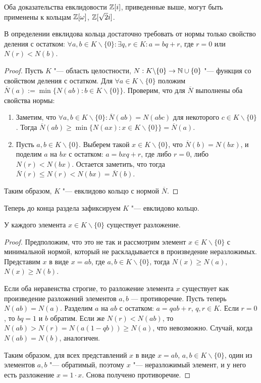\begin{note}
	Оба доказательства евклидовости $\mathbb{Z}[i]$, приведенные выше, могут быть применены к кольцам $\mathbb{Z}[\omega]$, $\mathbb{Z}[\sqrt{2}i]$.
\end{note}

\begin{proposition}
	В определении евклидова кольца достаточно требовать от нормы только свойство деления с остатком: $\forall a, b \in K\backslash\{0\}: \exists q, r \in K: a = bq + r$, где $r = 0$ или $N(r) < N(b)$.
\end{proposition}

\begin{proof}
	Пусть $K$ "--- область целостности, $N: K \backslash \{0\} \to \mathbb{N} \cup \{0\}$ "--- функция со свойством деления с остатком. Для $\forall a \in K \backslash \{0\}$ положим $\overline{N}(a) := \min\{N(ab) : b \in K \backslash \{0\}\}$. Проверим, что для $\overline{N}$ выполнены оба свойства нормы:
	\begin{enumerate}
		\item Заметим, что $\forall a, b \in K \backslash \{0\}: \overline{N}(ab) = N(abc)$ для некоторого $c \in K \backslash \{0\}$. Тогда $\overline{N}(ab) \ge \min\{N(ax) : x \in K \backslash \{0\}\} = \overline{N}(a)$.
		\item Пусть $a, b \in K \backslash \{0\}$. Выберем такой $x \in K \backslash \{0\}$, что $\overline{N}(b) = N(bx)$, и поделим $a$ на $bx$ с остатком: $a = bxq + r$, где либо $r = 0$, либо $N(r) < N(bx)$. Остается заметить, что тогда $\overline{N}(r) \le N(r) < N(bx) = \overline{N}(b)$.
	\end{enumerate}
	
	Таким образом, $K$ "--- евклидово кольцо с нормой $\overline{N}$.
\end{proof}

Теперь до конца раздела зафиксируем $K$ "--- евклидово кольцо.

\begin{proposition}
	У каждого элемента $x \in K \backslash \{0\}$ существует разложение.
\end{proposition}

\begin{proof}
	Предположим, что это не так и рассмотрим элемент $x \in K \backslash \{0\}$ с минимальной нормой, который не раскладывается в произведение неразложимых. Представим $x$ в виде $x = ab$, где $a, b \in K \backslash \{0\}$, тогда $N(x) \ge N(a)$, $N(x) \ge N(b)$.
	
	Если оба неравенства строгие, то разложение элемента $x$ существует как произведение разложений элементов $a, b$ --- противоречие. Пусть теперь $N(ab) = N(a)$. Разделим $a$ на $ab$ с остатком: $a = qab + r$, $q, r \in K$. Если $r = 0$, то $bq = 1$ и $b$ обратим. Если же $N(r) < N(ab)$, то $N(ab) > N(r) = N(a(1 - qb)) \ge N(a)$, что невозможно. Случай, когда $N(ab) = N(b)$, аналогичен.
	
	Таким образом, для всех представлений $x$ в виде $x = ab$, $a, b \in K \backslash \{0\}$, один из элементов $a, b$ "--- обратимый, поэтому $x$ "--- неразложимый элемент, и у него есть разложение $x = 1 \cdot x$. Снова получено противоречие.
\end{proof}

